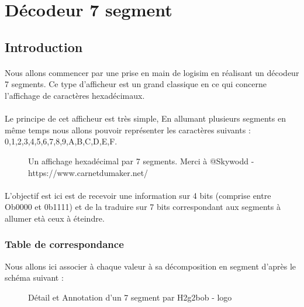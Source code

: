 \section{Décodeur 7 segment}
\subsection{Introduction}
\paragraph{}
Nous allons commencer par une prise en main de logisim en réalisant un décodeur 7 segments. Ce type d'afficheur est un grand classique en ce qui concerne l'affichage de caractères hexadécimaux.

\paragraph{}
Le principe de cet afficheur est très simple, En allumant plusieurs segments en même temps nous allons pouvoir représenter les caractères suivants :
0,1,2,3,4,5,6,7,8,9,A,B,C,D,E,F.

\begin{figure}[H]
	\caption{Un affichage hexadécimal par 7 segments. Merci à @Skywodd - https://www.carnetdumaker.net/}
\end{figure}

\paragraph{}
L'objectif est ici est de recevoir une information sur 4 bits (comprise entre Ob0000 et 0b1111) et de la traduire sur 7 bits correspondant aux segments à allumer età ceux à éteindre.

\subsubsection{Table de correspondance}
Nous allons ici associer à chaque valeur à sa décomposition en segment d'après le schéma suivant :
\begin{figure}[H]
	\caption{Détail et Annotation d'un 7 segment par H2g2bob - logo}
\end{figure}
